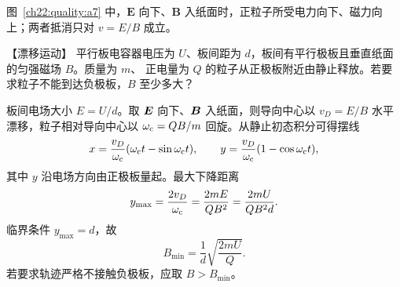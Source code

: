 {\begin{xesolution}
\begin{center}
\end{center}

图~\ref{ch22:quality:a7} 中，$\boldsymbol E$ 向下、$\boldsymbol B$ 入纸面时，正粒子所受电力向下、磁力向上；两者抵消只对 $v=E/B$ 成立。
\end{xesolution}



\begin{origexamplebox}{【漂移运动】}\label{ch22:ex:s38-7-8}
平行板电容器电压为 $U$、板间距为 $d$，板间有平行极板且垂直纸面的匀强磁场 $B$。质量为 $m$、
正电量为 $Q$ 的粒子从正极板附近由静止释放。若要求粒子不能到达负极板，$B$ 至少多大？

\begin{center}
\end{center}
\end{origexamplebox}\par\nopagebreak[4]

\begin{xesolution}
板间电场大小 $E=U/d$。取 $\bm{E}$ 向下、$\bm{B}$ 入纸面，则导向中心以
$v_D=E/B$ 水平漂移，粒子相对导向中心以 $\omega_{\rm c}=QB/m$ 回旋。从静止初态积分可得摆线
\[
  x=\frac{v_D}{\omega_{\rm c}}(\omega_{\rm c}t-\sin\omega_{\rm c}t),
  \qquad
  y=\frac{v_D}{\omega_{\rm c}}(1-\cos\omega_{\rm c}t),
\]
其中 $y$ 沿电场方向由正极板量起。最大下降距离
\begin{equation}
  y_{\max}=\frac{2v_D}{\omega_{\rm c}}
  =\frac{2mE}{QB^2}=\frac{2mU}{QB^2d}.
\end{equation}
临界条件 $y_{\max}=d$，故
\begin{equation}
  \boxed{B_{\min}=\frac1d\sqrt{\frac{2mU}{Q}}}.
\end{equation}
若要求轨迹严格不接触负极板，应取 $B>B_{\min}$。


\end{xesolution}}
